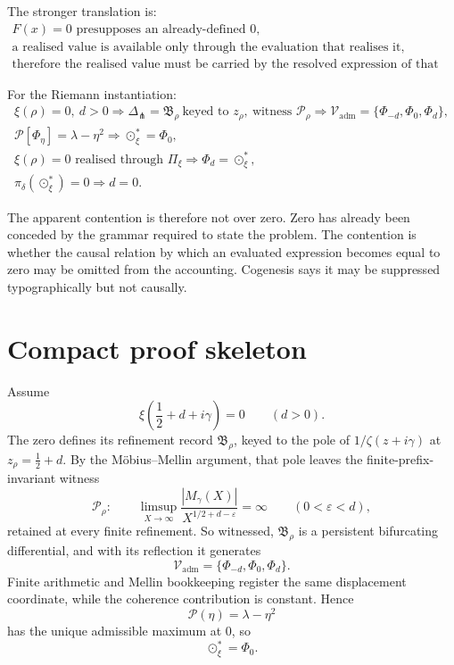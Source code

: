 \documentclass[11pt]{article}
\newcommand{\Pheart}{\mathcal P}
\newcommand{\DeltaFork}{\Delta_{\pitchfork}}
\begin{document}
The stronger translation is:
\[
\boxed{
\begin{gathered}
F(x)=0\text{ presupposes an already-defined }0,\\[2pt]
\text{a realised value is available only through the evaluation that realises it},\\[2pt]
\text{therefore the realised value must be carried by the resolved expression of that evaluation.}
\end{gathered}}
\]

For the Riemann instantiation:
\[
\boxed{
\begin{gathered}
\xi(\rho)=0,\ d>0
\Longrightarrow
\DeltaFork=\mathfrak B_\rho\ \text{keyed to }z_\rho,
\ \text{witness }\mathcal P_\rho
\Longrightarrow
\mathcal V_{\mathrm{adm}}
=
\{\Phi_{-d},\Phi_0,\Phi_d\},\\[2pt]
\Pheart[\Phi_\eta]
=
\lambda-\eta^2
\Longrightarrow
\odot_\xi^\ast=\Phi_0,\\[2pt]
\xi(\rho)=0
\text{ realised through }\Pi_\xi
\Longrightarrow
\Phi_d=\odot_\xi^\ast,\\[2pt]
\pi_\delta(\odot_\xi^\ast)=0
\Longrightarrow
d=0.
\end{gathered}}
\]

The apparent contention is therefore not over zero. Zero has already been conceded by the grammar required to state the problem. The contention is whether the causal relation by which an evaluated expression becomes equal to zero may be omitted from the accounting. Cogenesis says it may be suppressed typographically but not causally.

\section{Compact proof skeleton}

Assume
\[
\xi\!\left(\frac12+d+i\gamma\right)=0
\qquad(d>0).
\]
The zero defines its refinement record \(\mathfrak B_\rho\), keyed to the pole of \(1/\zeta(z+i\gamma)\) at \(z_\rho=\frac12+d\). By the M\"obius--Mellin argument, that pole leaves the finite-prefix-invariant witness
\[
\mathcal P_\rho:
\qquad
\limsup_{X\to\infty}
\frac{|M_\gamma(X)|}{X^{1/2+d-\varepsilon}}
=
\infty
\qquad(0<\varepsilon<d),
\]
retained at every finite refinement. So witnessed, \(\mathfrak B_\rho\) is a persistent bifurcating differential, and with its reflection it generates
\[
\mathcal V_{\mathrm{adm}}
=
\{\Phi_{-d},\Phi_0,\Phi_d\}.
\]
Finite arithmetic and Mellin bookkeeping register the same displacement coordinate, while the coherence contribution is constant. Hence
\[
\Pheart(\eta)=\lambda-\eta^2
\]
has the unique admissible maximum at \(0\), so
\[
\odot_\xi^\ast=\Phi_0.
\]
\end{document}

